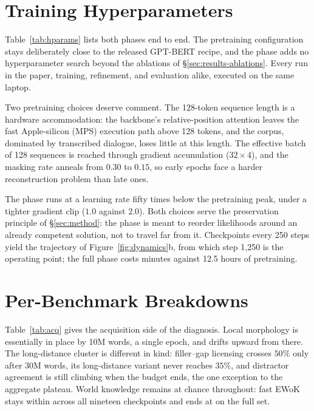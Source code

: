 \section{Training Hyperparameters}
\label{sec:app-hparams}

Table~\ref{tab:hparams} lists both phases end to end. The pretraining
configuration stays deliberately close to the released GPT-BERT recipe,
and the \MPO{} phase adds no hyperparameter search beyond the ablations of
\S\ref{sec:results-ablations}. Every run in the paper, training,
refinement, and evaluation alike, executed on the same laptop.

Two pretraining choices deserve comment. The 128-token sequence length is
a hardware accommodation: the backbone's relative-position attention
leaves the fast Apple-silicon (MPS) execution path above 128 tokens, and
the corpus, dominated by transcribed dialogue, loses little at this
length. The effective batch of 128 sequences is reached through gradient
accumulation ($32 \times 4$), and the masking rate anneals from $0.30$ to
$0.15$, so early epochs face a harder reconstruction problem than late
ones.

The \MPO{} phase runs at a learning rate fifty times below the
pretraining peak, under a tighter gradient clip ($1.0$ against $2.0$).
Both choices serve the preservation principle of \S\ref{sec:method}: the
phase is meant to reorder likelihoods around an already competent
solution, not to travel far from it. Checkpoints every 250 steps yield
the trajectory of Figure~\ref{fig:dynamics}b, from which step 1{,}250 is
the operating point; the full phase costs \rDpoMinutes{} minutes against
12.5 hours of pretraining.



\section{Per-Benchmark Breakdowns}
\label{sec:appendix}



Table~\ref{tab:acq} gives the acquisition side of the diagnosis. Local
morphology is essentially in place by 10M words, a single epoch, and
drifts upward from there. The long-distance cluster is different in kind:
filler--gap licensing crosses $50\%$ only after 30M words, its
long-distance variant never reaches $35\%$, and distractor agreement is
still climbing when the budget ends, the one exception to the aggregate
plateau. World knowledge remains at chance throughout: fast EWoK stays
within \rEwokTrajRange{} across all nineteen checkpoints and ends at
\rEwokBase{} on the full set.


